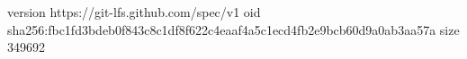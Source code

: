 version https://git-lfs.github.com/spec/v1
oid sha256:fbc1fd3bdeb0f843c8c1df8f622c4eaaf4a5c1ecd4fb2e9bcb60d9a0ab3aa57a
size 349692

